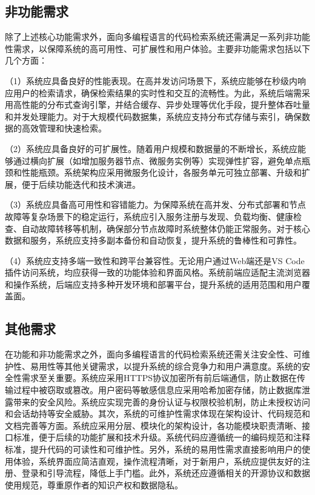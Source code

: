 \documentclass[UTF8,a4paper,12pt]{ctexart}
\numberwithin{equation}{section}
\begin{document}
\subsection{非功能需求}
除了上述核心功能需求外，面向多编程语言的代码检索系统还需满足一系列非功能性需求，以保障系统的高可用性、可扩展性和用户体验。主要非功能需求包括以下几个方面：\par
（1）系统应具备良好的性能表现。在高并发访问场景下，系统应能够在秒级内响应用户的检索请求，确保检索结果的实时性和交互的流畅性。为此，系统后端需采用高性能的分布式查询引擎，并结合缓存、异步处理等优化手段，提升整体吞吐量和并发处理能力。对于大规模代码数据集，系统应支持分布式存储与索引，确保数据的高效管理和快速检索。\par
（2）系统应具备良好的可扩展性。随着用户规模和数据量的不断增长，系统应能够通过横向扩展（如增加服务器节点、微服务实例等）实现弹性扩容，避免单点瓶颈和性能瓶颈。系统架构应采用微服务化设计，各服务单元可独立部署、升级和扩展，便于后续功能迭代和技术演进。\par
（3）系统应具备高可用性和容错能力。为保障系统在高并发、分布式部署和节点故障等复杂场景下的稳定运行，系统应引入服务注册与发现、负载均衡、健康检查、自动故障转移等机制，确保部分节点故障时系统整体仍能正常服务。对于核心数据和服务，系统应支持多副本备份和自动恢复，提升系统的鲁棒性和可靠性。\par
（4）系统应支持多端一致性和跨平台兼容性。无论用户通过Web端还是VS Code插件访问系统，均应获得一致的功能体验和界面风格。系统前端应适配主流浏览器和操作系统，后端应支持多种开发环境和部署平台，提升系统的适用范围和用户覆盖面。\par
\subsection{其他需求}
在功能和非功能需求之外，面向多编程语言的代码检索系统还需关注安全性、可维护性、易用性等其他关键需求，以提升系统的综合竞争力和用户满意度。系统的安全性需求至关重要。系统应采用HTTPS协议加密所有前后端通信，防止数据在传输过程中被窃取或篡改。用户密码等敏感信息应采用哈希加密存储，防止数据库泄露带来的安全风险。系统应实现完善的身份认证与权限校验机制，防止未授权访问和会话劫持等安全威胁。其次，系统的可维护性需求体现在架构设计、代码规范和文档完善等方面。系统应采用分层、模块化的架构设计，各功能模块职责清晰、接口标准，便于后续的功能扩展和技术升级。系统代码应遵循统一的编码规范和注释标准，提升代码的可读性和可维护性。另外，系统的易用性需求直接影响用户的使用体验，系统界面应简洁直观，操作流程清晰，对于新用户，系统应提供友好的注册、登录和引导流程，降低上手门槛。此外，系统还应遵循相关的开源协议和数据使用规范，尊重原作者的知识产权和数据隐私。\par
\end{document}
